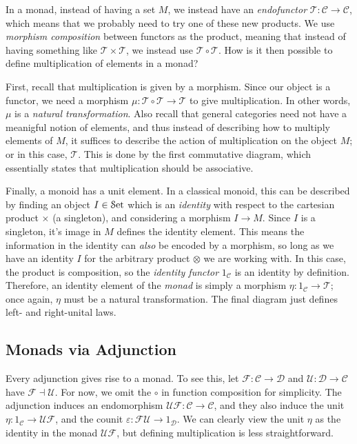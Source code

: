 In a monad, instead of having a set $M$, we instead have an \emph{endofunctor} $\mathcal{T} : \mathcal{C}  \to \mathcal{C} $, which means that we probably need to try one of these new products. We use \emph{morphism composition} between functors as the product, meaning that instead of having something like $\mathcal{T} \times \mathcal{T} $, we instead use $\mathcal{T} \circ \mathcal{T} $. How is it then possible to define multiplication of elements in a monad?

First, recall that multiplication is given by a morphism. Since our object is a functor, we need a morphism $\mu : \mathcal{T} \circ \mathcal{T}  \to \mathcal{T} $ to give multiplication. In other words, $\mu $ is a \emph{natural transformation}. Also recall that general categories need not have a meanigful notion of elements, and thus instead of describing how to multiply elements of $M$, it suffices to describe the action of multiplication on the object $M$; or in this case, $\mathcal{T} $. This is done by the first commutative diagram, which essentially states that multiplication should be associative.

Finally, a monoid has a unit element. In a classical monoid, this can be described by finding an object $I\in \mathcal{S}\mathrm{et} $ which is an \emph{identity} with respect to the cartesian product $\times $ (a singleton), and considering a morphism $I\to M$. Since $I$ is a singleton, it's image in $M$ defines the identity element. This means the information in the identity can \emph{also} be encoded by a morphism, so long as we have an identity $I$ for the arbitrary product $\otimes $ we are working with. In this case, the product is composition, so the \emph{identity functor} $1_{\mathcal{C} } $ is an identity by definition. Therefore, an identity element of the \emph{monad} is simply a morphism $\eta : 1_{\mathcal{C} }  \to \mathcal{T} $; once again, $\eta $ must be a natural transformation. The final diagram just defines left- and right-unital laws.

\subsection{Monads via Adjunction}

Every adjunction gives rise to a monad. To see this, let $\mathcal{F} : \mathcal{C}  \to \mathcal{D} $ and $\mathcal{U} : \mathcal{D}  \to \mathcal{C} $ have $\mathcal{F} \dashv \mathcal{U} $. For now, we omit the $\circ $ in function composition for simplicity. The adjunction induces an endomorphism $\mathcal{UF} : \mathcal{C}  \to \mathcal{C} $, and they also induce the unit $\eta : 1_\mathcal{C}  \to \mathcal{U} \mathcal{F} $, and the counit $\varepsilon : \mathcal{F} \mathcal{U}  \to 1_\mathcal{D} $. We can clearly view the unit $\eta $ as the identity in the monad $\mathcal{U} \mathcal{F} $, but defining multiplication is less straightforward.

